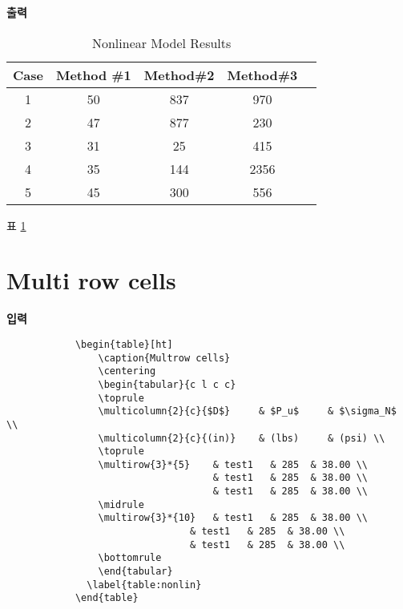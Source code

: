 \documentclass[12pt,a4paper]{report}
\begin{document}
	\textbf{출력}
				\begin{table}[ht]
					\caption{Nonlinear Model Results}
					\centering
					\begin{tabular}{c c c c c}
					\toprule
					Case & Method \#1 & Method\#2 & Method\#3 \\ [0.5ex]
					\midrule
					1   & 50   & 837  & 970 \\
					2   & 47   & 877  & 230 \\
				    3   & 31   & 25   & 415  \\
				    4   & 35   & 144  & 2356 \\
				    5   & 45   & 300  & 556  \\ [1ex]
				    \bottomrule
				    \end{tabular}%
				  \label{table:nonlin}%
				\end{table}
				
		표 \ref{table:nonlin}
		

%
%
\newpage  
\section{Multi row cells}
\null
	\singlespacing
	\textbf{입력}\\
		\begin{boxedminipage}[t]{1.0\linewidth}
		\small
		\begin{verbatim}
			\begin{table}[ht]
				\caption{Multrow cells}
				\centering
			    \begin{tabular}{c l c c}
			    \toprule
				\multicolumn{2}{c}{$D$} 	& $P_u$ 	& $\sigma_N$ \\
				\multicolumn{2}{c}{(in)} 	& (lbs) 	& (psi) \\
			    \toprule
			    \multirow{3}*{5}  	& test1   & 285  & 38.00 \\
							    	& test1   & 285  & 38.00 \\
							    	& test1   & 285  & 38.00 \\
			    \midrule
			    \multirow{3}*{10}	& test1   & 285  & 38.00 \\
								& test1   & 285  & 38.00 \\
								& test1   & 285  & 38.00 \\
			    \bottomrule
			    \end{tabular}
			  \label{table:nonlin}
			\end{table}
		\end{verbatim} 
		\end{boxedminipage} \\ \\
		
\end{document}
